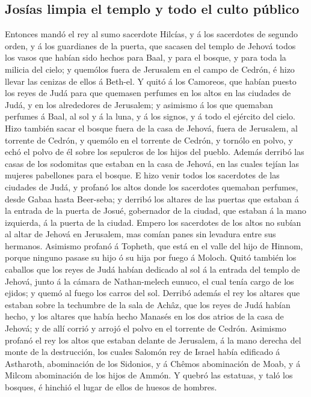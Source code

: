 \hypertarget{josuxedas-limpia-el-templo-y-todo-el-culto-puxfablico}{%
\subsection{Josías limpia el templo y todo el culto
público}\label{josuxedas-limpia-el-templo-y-todo-el-culto-puxfablico}}

 Entonces mandó el rey al sumo sacerdote Hilcías, y á los
sacerdotes de segundo orden, y á los guardianes de la puerta, que
sacasen del templo de Jehová todos los vasos que habían sido hechos para
Baal, y para el bosque, y para toda la milicia del cielo; y quemólos
fuera de Jerusalem en el campo de Cedrón, é hizo llevar las cenizas de
ellos á Beth-el.  Y quitó á los Camoreos, que habían puesto
los reyes de Judá para que quemasen perfumes en los altos en las
ciudades de Judá, y en los alrededores de Jerusalem; y asimismo á los
que quemaban perfumes á Baal, al sol y á la luna, y á los signos, y á
todo el ejército del cielo.  Hizo también sacar el bosque
fuera de la casa de Jehová, fuera de Jerusalem, al torrente de Cedrón, y
quemólo en el torrente de Cedrón, y tornólo en polvo, y echó el polvo de
él sobre los sepulcros de los hijos del pueblo.  Además
derribó las casas de los sodomitas que estaban en la casa de Jehová, en
las cuales tejían las mujeres pabellones para el bosque.  E
hizo venir todos los sacerdotes de las ciudades de Judá, y profanó los
altos donde los sacerdotes quemaban perfumes, desde Gabaa hasta
Beer-seba; y derribó los altares de las puertas que estaban á la entrada
de la puerta de Josué, gobernador de la ciudad, que estaban á la mano
izquierda, á la puerta de la ciudad.  Empero los sacerdotes
de los altos no subían al altar de Jehová en Jerusalem, mas comían panes
sin levadura entre sus hermanos.  Asimismo profanó á
Topheth, que está en el valle del hijo de Hinnom, porque ninguno pasase
su hijo ó su hija por fuego á Moloch.  Quitó también los
caballos que los reyes de Judá habían dedicado al sol á la entrada del
templo de Jehová, junto á la cámara de Nathan-melech eunuco, el cual
tenía cargo de los ejidos; y quemó al fuego los carros del sol.
 Derribó además el rey los altares que estaban sobre la
techumbre de la sala de Achâz, que los reyes de Judá habían hecho, y los
altares que había hecho Manasés en los dos atrios de la casa de Jehová;
y de allí corrió y arrojó el polvo en el torrente de Cedrón.
 Asimismo profanó el rey los altos que estaban delante de
Jerusalem, á la mano derecha del monte de la destrucción, los cuales
Salomón rey de Israel había edificado á Astharoth, abominación de los
Sidonios, y á Chêmos abominación de Moab, y á Milcom abominación de los
hijos de Ammón.  Y quebró las estatuas, y taló los bosques,
é hinchió el lugar de ellos de huesos de hombres.


